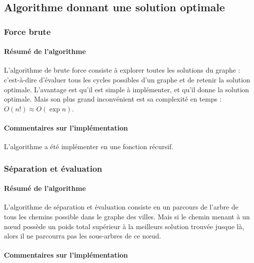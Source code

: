 \documentclass[10pt,a4paper]{report}
\begin{document}
	\subsection{Algorithme donnant une solution optimale}
		\subsubsection{Force brute}
		
		\paragraph{Résumé de l'algorithme}
		\begin{flushleft}
		L'algorithme de brute force consiste à explorer toutes les solutions du graphe : c'est-à-dire d'évaluer tous les cycles possibles d'un graphe et de retenir la solution optimale.
		L'avantage est qu'il est simple à implémenter, et qu'il donne la solution optimale.
		Mais son plus grand inconvénient est sa complexité en temps :  $O(n!) \approx O(\exp n)$.
		\end{flushleft}
		\paragraph{Commentaires sur l'implémentation}
		\begin{flushleft}
		L'algorithme a été implémenter en une fonction récursif.
		\end{flushleft}
		\subsubsection{Séparation et évaluation}
		
		\paragraph{Résumé de l'algorithme}
		\begin{flushleft}
		L'algorithme de séparation et évaluation consiste en un parcours de l'arbre de tous les chemins possible dans le graphe des villes. Mais si le chemin menant à un nœud possède un poids total supérieur à la meilleurs solution trouvée jusque là, alors il ne parcourra pas les sous-arbres de ce nœud.\\
		\end{flushleft}
		
		\paragraph{Commentaires sur l'implémentation}
		
\end{document}
